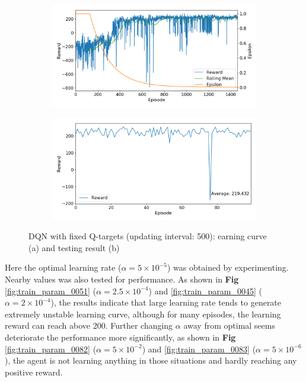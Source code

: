 \documentclass[10pt]{article}
\begin{document}
\begin{figure}[H]
  \centering
  \begin{subfigure}[b]{0.49\linewidth}
  \centering
  \includegraphics[width=\linewidth]{../logs/train_param_0057.png}
      \caption{}
  \label{fig:train_param_0057}
  \end{subfigure}
  \begin{subfigure}[b]{0.49\linewidth}
  \centering
  \includegraphics[width=\linewidth]{../logs/test_param_0057.png}
      \caption{}
  \label{fig:test_param_0057}
  \end{subfigure}
  \caption{DQN with fixed Q-targets (updating interval: 500): earning curve (a) and testing result (b)}
  \label{fig:param_0057}
\end{figure}


Here the optimal learning rate ($\alpha=5\times 10^{-5}$) was obtained by experimenting. Nearby values was also tested for performance. As shown in \textbf{Fig} \ref{fig:train_param_0051} ($\alpha=2.5\times 10^{-4}$) and \ref{fig:train_param_0045} ($\alpha=2\times 10^{-4}$), the results indicate that large learning rate tends to generate extremely unstable learning curve, although for many episodes, the learning reward can reach above 200. Further changing $\alpha$ away from optimal seems deteriorate the performance more significantly, as shown in \textbf{Fig} \ref{fig:train_param_0082} ($\alpha=5\times 10^{-2}$) and \ref{fig:train_param_0083} ($\alpha=5\times 10^{-6}$), the agent is not learning anything in those situations and hardly reaching any positive reward.
\end{document}
